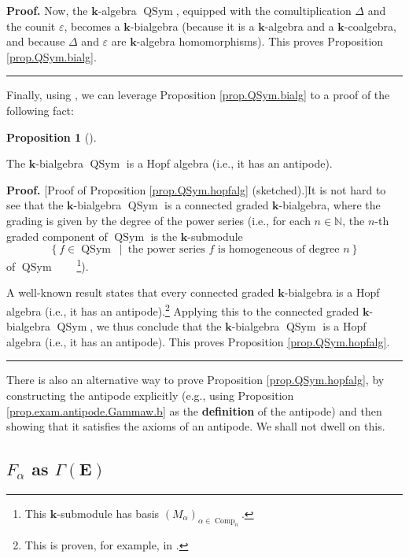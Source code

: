 \documentclass[numbers=enddot,12pt,final,onecolumn,notitlepage,abstracton]{scrartcl}
\theoremstyle{definition}
\newtheorem{prop}[theo]{Proposition}
\newenvironment{proposition}[1][]
{\begin{prop}[#1]\begin{leftbar}}
{\end{leftbar}\end{prop}}
\newenvironment{proof}[1][Proof]{\noindent\textbf{#1.} }{\ \rule{0.5em}{0.5em}}
\newenvironment{verlong}{}{}
\begin{document}
\begin{verlong}
\begin{footnotesize}
\begin{proof}
Now, the $\mathbf{k}$-algebra $\operatorname*{QSym}$, equipped with the
comultiplication $\Delta$ and the counit $\varepsilon$, becomes a $\mathbf{k}%
$-bialgebra (because it is a $\mathbf{k}$-algebra and a $\mathbf{k}%
$-coalgebra, and because $\Delta$ and $\varepsilon$ are $\mathbf{k}$-algebra
homomorphisms). This proves Proposition \ref{prop.QSym.bialg}.
\end{proof}

Finally, using \cite[Proposition 1.4.16]{Reiner}, we can leverage Proposition
\ref{prop.QSym.bialg} to a proof of the following fact:

\begin{proposition}
\label{prop.QSym.hopfalg}The $\mathbf{k}$-bialgebra $\operatorname*{QSym}$ is
a Hopf algebra (i.e., it has an antipode).
\end{proposition}

\begin{proof}
[Proof of Proposition \ref{prop.QSym.hopfalg} (sketched).]It is not hard to
see that the $\mathbf{k}$-bialgebra $\operatorname*{QSym}$ is a connected
graded $\mathbf{k}$-bialgebra, where the grading is given by the degree of the
power series (i.e., for each $n\in\mathbb{N}$, the $n$-th graded component of
$\operatorname*{QSym}$ is the $\mathbf{k}$-submodule%
\[
\left\{  f\in\operatorname*{QSym}\ \mid\ \text{the power series }f\text{ is
homogeneous of degree }n\right\}
\]
of $\operatorname*{QSym}$\ \ \ \ \footnote{This $\mathbf{k}$-submodule has
basis $\left(  M_{\alpha}\right)  _{\alpha\in\operatorname*{Comp}%
\nolimits_{n}}$.}).

A well-known result states that every connected graded $\mathbf{k}$-bialgebra
is a Hopf algebra (i.e., it has an antipode).\footnote{This is proven, for
example, in \cite[Proposition 1.4.16]{Reiner}.} Applying this to the connected
graded $\mathbf{k}$-bialgebra $\operatorname*{QSym}$, we thus conclude that
the $\mathbf{k}$-bialgebra $\operatorname*{QSym}$ is a Hopf algebra (i.e., it
has an antipode). This proves Proposition \ref{prop.QSym.hopfalg}.
\end{proof}

There is also an alternative way to prove Proposition \ref{prop.QSym.hopfalg},
by constructing the antipode explicitly (e.g., using Proposition
\ref{prop.exam.antipode.Gammaw.b} as the \textbf{definition} of the antipode)
and then showing that it satisfies the axioms of an antipode. We shall not
dwell on this.

\subsection{$F_{\alpha}$ as $\Gamma\left(  \mathbf{E}\right)  $}


\end{footnotesize}
\end{verlong}
\end{document}
